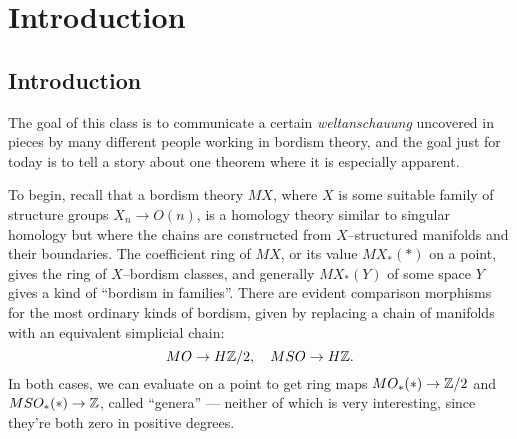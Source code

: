 
\setcounter{chapter}{-1}
\chapter{Introduction}

\section{Introduction}\label{IntroductionSection}

The goal of this class is to communicate a certain \textit{weltanschauung} uncovered in pieces by many different people working in bordism theory, and the goal just for today is to tell a story about one theorem where it is especially apparent.

To begin, recall that a bordism theory $MX$, where $X$ is some suitable family of structure groups $X_n \to O(n)$, is a homology theory similar to singular homology but where the chains are constructed from $X$--structured manifolds and their boundaries.  The coefficient ring of $MX$, or its value $MX_*(*)$ on a point, gives the ring of $X$--bordism classes, and generally $MX_*(Y)$ of some space $Y$ gives a kind of ``bordism in families''.  There are evident comparison morphisms for the most ordinary kinds of bordism, given by replacing a chain of manifolds with an equivalent simplicial chain: \[MO \to H\mathbb Z/2, \quad MSO \to H\mathbb Z.\] In both cases, we can evaluate on a point to get ring maps $MO_*(*) \to \mathbb Z/2$ and $MSO_*(*) \to \mathbb Z$, called ``genera'' --- neither of which is very interesting, since they're both zero in positive degrees.

